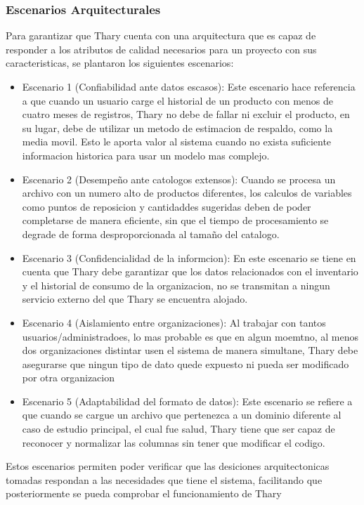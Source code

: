 \subsubsection{Escenarios Arquitecturales}
Para garantizar que Thary cuenta con una arquitectura que es capaz de responder a los atributos de calidad necesarios para un proyecto con sus caracteristicas, se plantaron los siguientes escenarios:
\begin{itemize}
    \item Escenario 1 (Confiabilidad ante datos escasos): Este escenario hace referencia a que cuando un usuario carge el historial de un producto con menos de cuatro meses de registros, Thary no debe de fallar ni excluir el producto, en su lugar, debe de utilizar un metodo de estimacion de respaldo, como la media movil. Esto le aporta valor al sistema cuando no exista suficiente informacion historica para usar un modelo mas complejo.
    \item Escenario 2 (Desempeño ante catologos extensos): Cuando se procesa un archivo con un numero alto de productos diferentes, los calculos de variables como puntos de reposicion y cantidaddes sugeridas deben de poder completarse de manera eficiente, sin que el tiempo de procesamiento se degrade de forma desproporcionada al tamaño del catalogo.
    \item Escenario 3 (Confidencialidad de la informcion): En este escenario se tiene en cuenta que Thary debe garantizar que los datos relacionados con el inventario y el historial de consumo de la organizacion, no se transmitan a ningun servicio externo del que Thary se encuentra alojado.
    \item Escenario 4 (Aislamiento entre organizaciones): Al trabajar con tantos usuarios/administradoes, lo mas probable es que en algun moemtno, al menos dos organizaciones distintar usen el sistema de manera simultane, Thary debe asegurarse que ningun tipo de dato quede expuesto ni pueda ser modificado por otra organizacion 
    \item Escenario 5 (Adaptabilidad del formato de datos): Este escenario se refiere a que cuando se cargue un archivo que pertenezca a un dominio diferente al caso de estudio principal, el cual fue salud, Thary tiene que ser capaz de reconocer y normalizar las columnas sin tener que modificar el codigo.
\end{itemize}

Estos escenarios permiten poder verificar que las desiciones arquitectonicas tomadas respondan a las necesidades que tiene el sistema, facilitando que posteriormente se pueda comprobar el funcionamiento de Thary
